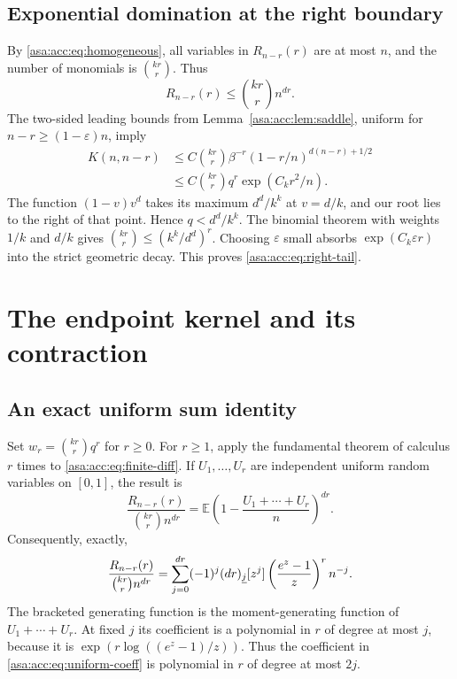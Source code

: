 \documentclass[11pt,letterpaper]{article}
\theoremstyle{remark}\newtheorem{remark}[theorem]{Remark}
\numberwithin{equation}{section}
\newcommand{\E}{\mathbb E}\newcommand{\Prob}{\mathbb P}\newcommand{\Prb}{\mathbb P}
\begin{document}
\subsection{Exponential domination at the right boundary}
By \eqref{asa:acc:eq:homogeneous}, all variables in $R_{n-r}(r)$ are at most $n$, and the number of monomials is $\binom{kr}{r}$. Thus
\[
R_{n-r}(r)\le\binom{kr}{r}n^{dr}.
\]
The two-sided leading bounds from Lemma~\ref{asa:acc:lem:saddle}, uniform for $n-r\ge(1-\varepsilon)n$, imply
\begin{align*}
K(n,n-r)&\le C\binom{kr}{r}\beta^{-r}
(1-r/n)^{d(n-r)+1/2}\\
&\le C\binom{kr}{r}q^r\exp(C_kr^2/n).
\end{align*}
The function $(1-v)v^d$ takes its maximum $d^d/k^k$ at $v=d/k$, and our root lies to the right of that point. Hence $q<d^d/k^k$. The binomial theorem with weights $1/k$ and $d/k$ gives $\binom{kr}{r}\le(k^k/d^d)^r$. Choosing $\varepsilon$ small absorbs $\exp(C_k\varepsilon r)$ into the strict geometric decay. This proves \eqref{asa:acc:eq:right-tail}.

\section{The endpoint kernel and its contraction}
\subsection{An exact uniform sum identity}
Set $w_r=\binom{kr}{r}q^r$ for $r\ge0$. For $r\ge1$, apply the fundamental theorem of calculus $r$ times to \eqref{asa:acc:eq:finite-diff}. If $U_1,\ldots,U_r$ are independent uniform random variables on $[0,1]$, the result is
\begin{equation}\label{asa:acc:eq:uniform}
\frac{R_{n-r}(r)}{\binom{kr}{r}n^{dr}}
=\E\left(1-\frac{U_1+\cdots+U_r}{n}\right)^{dr}.
\end{equation}
Consequently, exactly,
\begin{equation}\label{asa:acc:eq:uniform-coeff}
\frac{R_{n-r}(r)}{\binom{kr}{r}n^{dr}}
=\sum_{j=0}^{dr}(-1)^j(dr)_{\underline{j}}
[z^j]\left(\frac{e^z-1}{z}\right)^r n^{-j}.
\end{equation}
The bracketed generating function is the moment-generating function of $U_1+\cdots+U_r$. At fixed $j$ its coefficient is a polynomial in $r$ of degree at most $j$, because it is $\exp(r\log((e^z-1)/z))$. Thus the coefficient in \eqref{asa:acc:eq:uniform-coeff} is polynomial in $r$ of degree at most $2j$.
\end{document}

